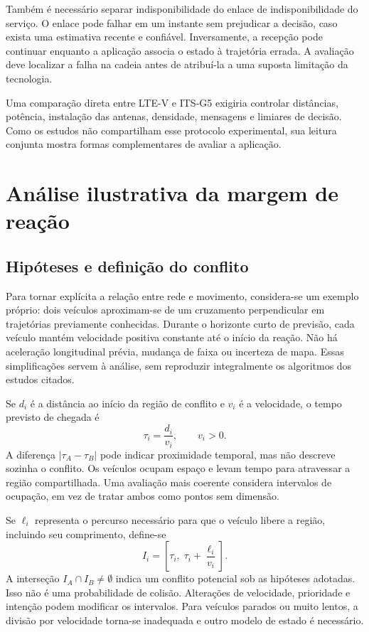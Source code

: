 \documentclass[conference,a4paper]{IEEEtran}
\begin{document}
Também é necessário separar indisponibilidade do enlace de indisponibilidade do serviço. O enlace pode falhar em um instante sem prejudicar a decisão, caso exista uma estimativa recente e confiável. Inversamente, a recepção pode continuar enquanto a aplicação associa o estado à trajetória errada. A avaliação deve localizar a falha na cadeia antes de atribuí-la a uma suposta limitação da tecnologia.

Uma comparação direta entre LTE-V e ITS-G5 exigiria controlar distâncias, potência, instalação das antenas, densidade, mensagens e limiares de decisão. Como os estudos não compartilham esse protocolo experimental, sua leitura conjunta mostra formas complementares de avaliar a aplicação.

\section{Análise ilustrativa da margem de reação}
\subsection{Hipóteses e definição do conflito}
Para tornar explícita a relação entre rede e movimento, considera-se um exemplo próprio: dois veículos aproximam-se de um cruzamento perpendicular em trajetórias previamente conhecidas. Durante o horizonte curto de previsão, cada veículo mantém velocidade positiva constante até o início da reação. Não há aceleração longitudinal prévia, mudança de faixa ou incerteza de mapa. Essas simplificações servem à análise, sem reproduzir integralmente os algoritmos dos estudos citados.

Se $d_i$ é a distância ao início da região de conflito e $v_i$ é a velocidade, o tempo previsto de chegada é
\begin{equation}
 \tau_i=\frac{d_i}{v_i},\qquad v_i>0.
 \label{eq:chegada}
\end{equation}
A diferença $|\tau_A-\tau_B|$ pode indicar proximidade temporal, mas não descreve sozinha o conflito. Os veículos ocupam espaço e levam tempo para atravessar a região compartilhada. Uma avaliação mais coerente considera intervalos de ocupação, em vez de tratar ambos como pontos sem dimensão.

Se $\ell_i$ representa o percurso necessário para que o veículo libere a região, incluindo seu comprimento, define-se
\begin{equation}
 I_i=\left[\tau_i,\;\tau_i+\frac{\ell_i}{v_i}\right].
\end{equation}
A interseção $I_A\cap I_B\ne\emptyset$ indica um conflito potencial sob as hipóteses adotadas. Isso não é uma probabilidade de colisão. Alterações de velocidade, prioridade e intenção podem modificar os intervalos. Para veículos parados ou muito lentos, a divisão por velocidade torna-se inadequada e outro modelo de estado é necessário.
\end{document}

